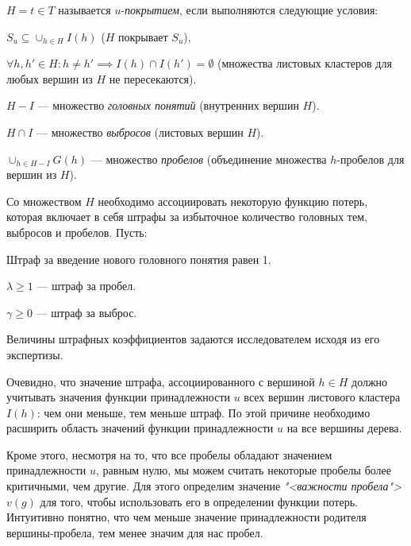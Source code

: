 \documentclass[12pt]{article}
\newenvironment{itemize*}%
{\begin{itemize}%
		\setlength{\itemsep}{0pt}%
		\setlength{\parskip}{0pt}}%
	{\end{itemize}}
\newenvironment{enumerate*}%
{\begin{enumerate}%
		\setlength{\itemsep}{0pt}%
		\setlength{\parskip}{0pt}}%
	{\end{enumerate}}
\begin{document}
\begin{itemize*}
	\item $H={t\in T}$ называется $u$-\textit{покрытием}, если выполняются следующие условия:
	\begin{enumerate*}
		\item $S_u\subseteq \cup_{h\in H}I(h)$ ($H$ покрывает $S_u$),
		\item $\forall h, h' \in H: h\neq h' \implies I(h)\cap I(h') = \emptyset$ (множества листовых кластеров для любых вершин из $H$ не пересекаются).
	\end{enumerate*}
	\item $H-I$ --- множество \textit{головных понятий} (внутренних вершин $H$).
	\item $H\cap I$ --- множество \textit{выбросов} (листовых вершин $H$).
	\item $\cup_{h\in H-I}G(h) $  --- множество \textit{пробелов} (объединение множества $h$-пробелов для вершин из $H$).
\end{itemize*}

Со множеством $H$ необходимо ассоциировать некоторую функцию потерь, которая включает в себя штрафы за избыточное количество головных тем, выбросов и пробелов. Пусть:

\begin{itemize*}
	\item Штраф за введение нового головного понятия равен 1.
	\item $\lambda\geq1$ --- штраф за пробел.
	\item $\gamma\geq0$ --- штраф за выброс.
\end{itemize*}
Величины штрафных коэффициентов задаются исследователем исходя из его экспертизы. 

Очевидно, что значение штрафа, ассоциированного с вершиной $h\in H$ должно учитывать значения функции принадлежности $u$ всех вершин листового кластера $I(h)$: чем они меньше, тем меньше штраф. По этой причине необходимо расширить область значений функции принадлежности $u$ на все вершины дерева.

Кроме этого, несмотря на то, что все пробелы обладают значением принадлежности $u$, равным нулю, мы можем считать некоторые пробелы более критичными, чем другие. Для этого определим значение \textit{"<важности пробела">} $v(g)$ для того, чтобы использовать его в определении функции потерь. Интуитивно понятно, что чем меньше значение принадлежности родителя вершины-пробела, тем менее значим для нас пробел.
\end{document}

